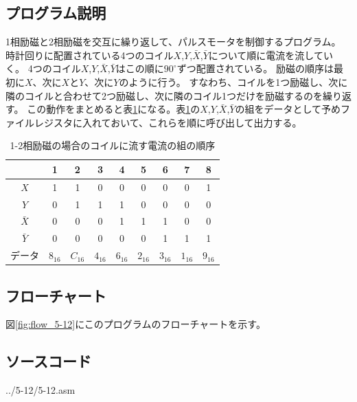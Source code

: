 \documentclass[a4paper,12pt]{ujarticle}
\begin{document}
  \subsection{プログラム説明}
    1相励磁と2相励磁を交互に繰り返して、パルスモータを制御するプログラム。
    時計回りに配置されている4つのコイル$X$,$Y$,$\bar{X}$,$\bar{Y}$について順に電流を流していく。
    4つのコイル$X$,$Y$,$\bar{X}$,$\bar{Y}$はこの順に$90^\circ$ずつ配置されている。
    励磁の順序は最初に$X$、次に$X$と$Y$、次に$Y$のように行う。
    すなわち、コイルを1つ励磁し、次に隣のコイルと合わせて2つ励磁し、次に隣のコイル1つだけを励磁するのを繰り返す。
    この動作をまとめると表\ref{table:1-2}になる。表\ref{table:1-2}の$X$,$Y$,$\bar{X}$,$\bar{Y}$の組をデータとして予めファイルレジスタに入れておいて、これらを順に呼び出して出力する。
    \begin{table}[h]
     \begin{center}
      \caption{1-2相励磁の場合のコイルに流す電流の組の順序}
      \label{table:1-2}
      \vspace{2mm}
      \begin{tabular}[h]{|c||c|c|c|c|c|c|c|c|}\hline
       &1&2&3&4&5&6&7&8 \\ \hline \hline
       $X$&1&1&0&0&0&0&0&1 \\
       $Y$&0&1&1&1&0&0&0&0 \\
       $\bar{X}$&0&0&0&1&1&1&0&0 \\
       $\bar{Y}$&0&0&0&0&0&1&1&1 \\ \hline \hline
      データ &$8_{16}$&$C_{16}$&$4_{16}$&$6_{16}$&$2_{16}$&$3_{16}$&$1_{16}$&$9_{16}$ \\ \hline
      \end{tabular}
     \end{center}
    \end{table}
  \subsection{フローチャート}
    図\ref{fig:flow_5-12}にこのプログラムのフローチャートを示す。
  \subsection{ソースコード}
    \begin{lstinputlisting}[basicstyle=\ttfamily\footnotesize, frame=single,numbers=left]
     {../5-12/5-12.asm}
    \end{lstinputlisting}
\end{document}
